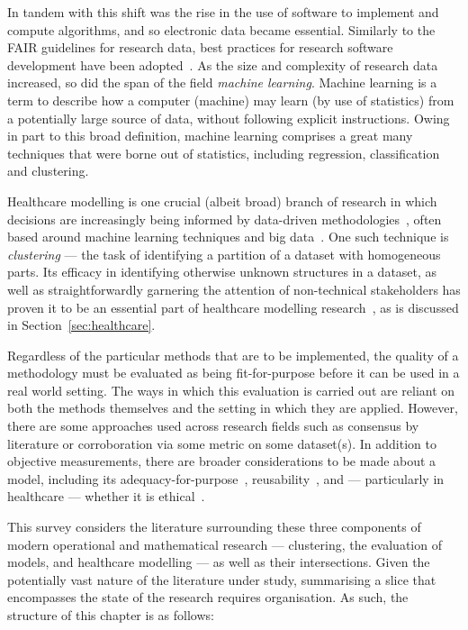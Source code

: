 In tandem with this shift was the rise in the use of software to implement and
compute algorithms, and so electronic data became essential. Similarly to the
FAIR guidelines for research data, best practices for research software
development have been adopted~\cite{Aberdour2007,Benureau2018,Jimenez2017}. As
the size and complexity of research data increased, so did the span of the field
\emph{machine learning}. Machine learning is a term to describe how a computer
(machine) may learn (by use of statistics) from a potentially large source of
data, without following explicit instructions. Owing in part to this broad
definition, machine learning comprises a great many techniques that were borne
out of statistics, including regression, classification and clustering.

Healthcare modelling is one crucial (albeit broad) branch of research in which
decisions are increasingly being informed by data-driven
methodologies~\cite{Belle2015,Katsaliaki2011,RiosZertuche2020}, often based
around machine learning techniques and big
data~\cite{Alexander2018,Archenaa2015}. One such technique is \emph{clustering}
--- the task of identifying a partition of a dataset with homogeneous parts. Its
efficacy in identifying otherwise unknown structures in a dataset, as well as
straightforwardly garnering the attention of non-technical stakeholders has
proven it to be an essential part of healthcare modelling
research~\cite{Tomar2013,Yoo2011}, as is discussed in
Section~\ref{sec:healthcare}.

Regardless of the particular methods that are to be implemented, the quality of
a methodology must be evaluated as being fit-for-purpose before it can be used
in a real world setting. The ways in which this evaluation is carried out are
reliant on both the methods themselves and the setting in which they are
applied. However, there are some approaches used across research fields such as
consensus by literature or corroboration via some metric on some dataset(s). In
addition to objective measurements, there are broader considerations to be made
about a model, including its adequacy-for-purpose~\cite{Parker2020},
reusability~\cite{Robinson2004}, and --- particularly in healthcare --- whether
it is ethical~\cite{Grote2020}.

This survey considers the literature surrounding these three components of
modern operational and mathematical research --- clustering, the evaluation of
models, and healthcare modelling --- as well as their intersections. Given the
potentially vast nature of the literature under study, summarising a slice that
encompasses the state of the research requires organisation. As such, the
structure of this chapter is as follows:

